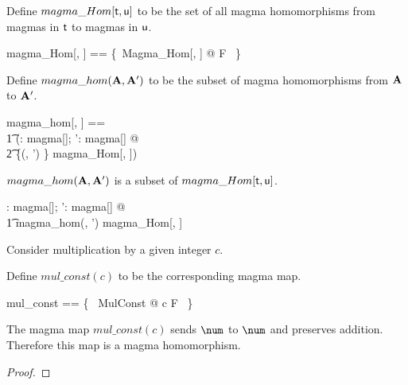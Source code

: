 \documentclass{amsart}
\begin{document}
Define $magma\_Hom[\mathsf{t}, \mathsf{u}]$ to be the set of all magma homomorphisms
from magmas in $\mathsf{t}$ to magmas in $\mathsf{u}$.

\begin{zed}
	magma\_Hom[\genT, \genU] == \{~Magma\_Hom[\genT, \genU] @ F ~\}
\end{zed}

Define $magma\_hom(\mathbf{A}, \mathbf{A}')$ to be the subset of magma homomorphisms 
from $\mathbf{A}$ to $\mathbf{A}'$.

\begin{zed}
	magma\_hom[\genT, \genU] == \\
	\t1	(\lambda \strucA: magma[\genT]; \strucA': magma[\genU] @ \\
	\t2		\{(\strucA, \strucA') \} \dres magma\_Hom[\genT, \genU])
\end{zed}

\begin{remark} $magma\_hom(\mathbf{A}, \mathbf{A}')$ is a subset of $magma\_Hom[\mathsf{t}, \mathsf{u}]$.

\begin{zed}
	\forall \strucA: magma[\setT]; \strucA': magma[\setU] @ \\
	\t1	magma\_hom(\strucA, \strucA') \subseteq magma\_Hom[\setT, \setU]
\end{zed}

\end{remark}

\begin{example}

Consider multiplication by a given integer $c$.


Define $mul\_const(c)$ to be the corresponding magma map.

\begin{zed}
	mul\_const == \{~ MulConst @ c \mapsto F ~\}
\end{zed}

The magma map $mul\_const(c)$ sends $\num$ to $\num$ and preserves addition.
Therefore this map is a magma homomorphism.


\begin{proof}
\end{proof}

\end{example}
\end{document}
